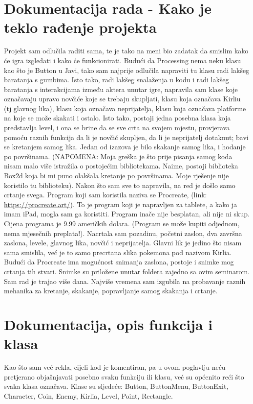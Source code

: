 \documentclass[12pt]{article}
\begin{document}
\section{Dokumentacija rada - Kako je teklo rađenje projekta}
Projekt sam odlučila raditi sama, te je tako na meni bio zadatak da smislim kako će igra izgledati i kako će funkcionirati. Budući da Processing nema neku klasu kao što je Button u Javi, tako sam najprije odlučila napraviti tu klasu radi lakšeg baratanja s gumbima. Isto tako, radi lakšeg snalaženja u kodu i radi lakšeg baratanja s interakcijama između aktera unutar igre, napravila sam klase koje označavaju upravo novčiće koje se trebaju skupljati, klasu koja označava Kirliu (tj glavnog lika), klasu koja označava neprijatelja, klasu koja označava platforme na koje se može skakati i ostalo. Isto tako, postoji jedna posebna klasa koja predstavlja level, i ona se brine da se sve crta na svojem mjestu, provjerava pomoću raznih funkcija da li je novčić skupljen, da li je neprijatelj dotaknut; bavi se kretanjem samog lika.
Jedan od izazova je bilo skakanje samog lika, i hodanje po površinama. (NAPOMENA: Moja greška je što prije pisanja samog koda nisam malo više istražila o postojećim bibliotekama. Naime, postoji biblioteka Box2d koja bi mi puno olakšala kretanje po površinama. Moje rješenje nije koristilo tu biblioteku). Nakon što sam sve to napravila, na red je došlo samo crtanje svega. Program koji sam koristila naziva se Procreate, (link: \url{https://procreate.art/}). To je program koji je napravljen za tablete, a kako ja imam iPad, mogla sam ga koristiti. Program inače nije besplatan, ali nije ni skup. Cijena programa je 9.99 američkih dolara. (Program se može kupiti odjednom, nema mjesečnih preplata!). Nacrtala sam pozadinu, početni zaslon, dva završna zaslona, levele, glavnog lika, novčić i neprijatelja. Glavni lik je jedino što nisam sama smislila, već je to samo precrtana slika pokemona pod nazivom Kirlia. Budući da Procreate ima mogućnost snimanja zaslona, postoje i snimke mog crtanja tih stvari. Snimke su priložene unutar foldera zajedno sa ovim seminarom. Sam rad je trajao više dana. Najviše vremena sam izgubila na probavanje raznih mehanika za kretanje, skakanje, popravljanje samog skakanja i crtanje.
\newpage

\section{Dokumentacija, opis funkcija i klasa}
Kao što sam već rekla, cijeli kod je komentiran, pa u ovom poglavlju neću pretjerano objašnjavati posebno svaku funkciju ili klasu, već su općenito reći što svaka klasa označava.
Klase su sljedeće: Button, ButtonMenu, ButtonExit, Character, Coin, Enemy, Kirlia, Level, Point, Rectangle.
\end{document}
